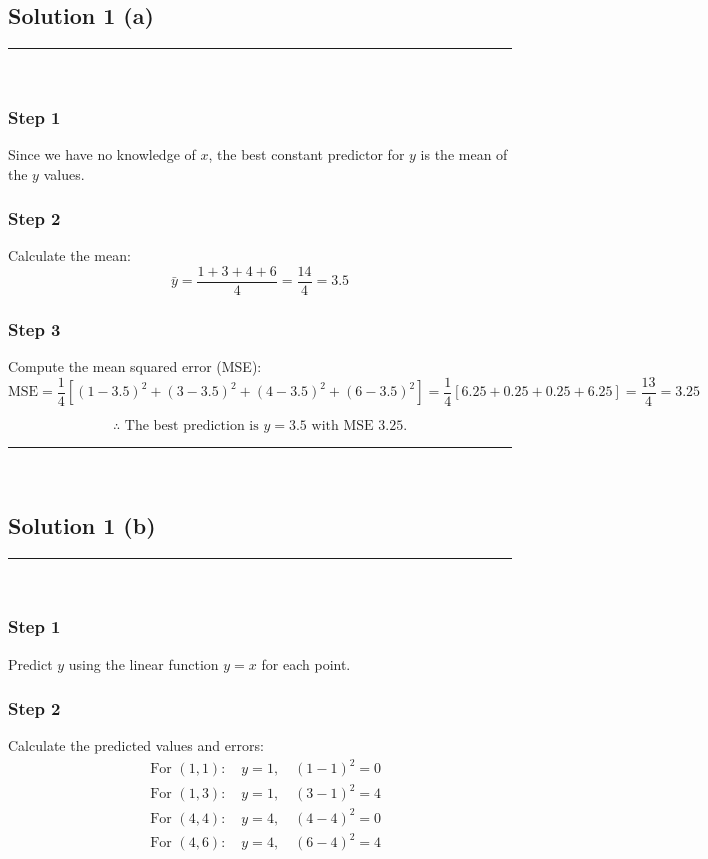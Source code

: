 \documentclass{article}
\begin{document}
\pagestyle{fancy}

\subsection*{Solution 1 (a)}
\noindent\rule{\textwidth}{0.4pt}\\

\subsubsection*{Step 1}
\parbox{\textwidth}{
Since we have no knowledge of $x$, the best constant predictor for $y$ is the mean of the $y$ values.
}

\subsubsection*{Step 2}
\parbox{\textwidth}{
Calculate the mean:
\[
\bar{y} = \frac{1 + 3 + 4 + 6}{4} = \frac{14}{4} = 3.5
\]
}

\subsubsection*{Step 3}
\parbox{\textwidth}{
Compute the mean squared error (MSE):
\[
\text{MSE} = \frac{1}{4} \left[(1-3.5)^2 + (3-3.5)^2 + (4-3.5)^2 + (6-3.5)^2\right]
= \frac{1}{4} \left[6.25 + 0.25 + 0.25 + 6.25\right]
= \frac{13}{4} = 3.25
\]
}

\parbox{\textwidth}{
\[
\therefore \text{ The best prediction is } y = 3.5 \text{ with MSE } 3.25.
\]
}

\noindent\rule{\textwidth}{0.4pt}\\

\newpage

\subsection*{Solution 1 (b)}
\noindent\rule{\textwidth}{0.4pt}\\

\subsubsection*{Step 1}
\parbox{\textwidth}{
Predict $y$ using the linear function $y = x$ for each point.
}

\subsubsection*{Step 2}
\parbox{\textwidth}{
Calculate the predicted values and errors:
\[
\begin{aligned}
&\text{For } (1,1):\quad y = 1,\quad (1-1)^2 = 0 \\
&\text{For } (1,3):\quad y = 1,\quad (3-1)^2 = 4 \\
&\text{For } (4,4):\quad y = 4,\quad (4-4)^2 = 0 \\
&\text{For } (4,6):\quad y = 4,\quad (6-4)^2 = 4 \\
\end{aligned}
\]
}
\end{document}
